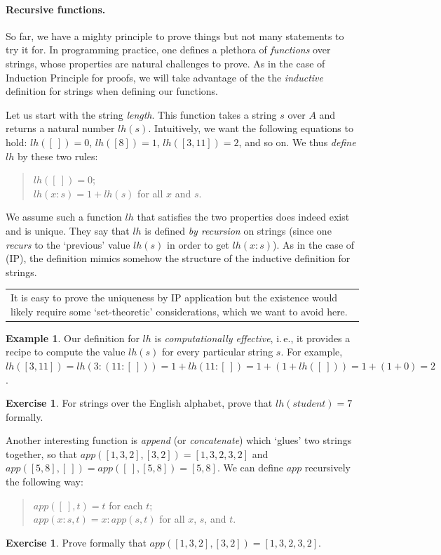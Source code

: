 \documentclass[12pt,notitlepage]{article}
\theoremstyle{plain}
\theoremstyle{definition}
\newtheorem{exc}[thm]{Exercise}
\newtheorem{exm}[thm]{Example}
\theoremstyle{plain}
\newcommand{\1}{\mathbf{1}}
\newcommand{\0}{\mathbf{0}}
\newcommand{\mcomm}[1]{
\medskip\noindent\begin{tabular}{| l}
\parbox{0.99\textwidth}{{\small
#1 }}\end{tabular}
\smallskip}
\begin{document}
\paragraph{Recursive functions.} So far, we have a mighty principle to prove things but not many statements to try it for. In programming practice, one defines a plethora of \emph{functions} over strings, whose properties are natural challenges to prove. As in the case of Induction Principle for proofs, we will take advantage of the the \emph{inductive} definition for strings when defining our functions.

Let us start with the string \emph{length}. This function takes a string $s$ over $A$ and returns a natural number $lh(s)$. Intuitively, we want the following equations to hold: $lh([\ ]) = 0$, $lh([8]) = 1$, $lh([3,11]) = 2$, and so on. We thus \emph{define} $lh$ by these two rules:
\begin{quote}
$lh([\ ]) = 0$;\\
$lh(x : s) = 1 + lh(s)$ for all $x$ and $s$.
\end{quote}
We assume such a function $lh$ that satisfies the two properties does indeed exist and is unique. They say that $lh$ is defined \emph{by recursion} on strings (since one \emph{recurs} to the `previous' value $lh(s)$ in order to get $lh(x: s)$). As in the case of (IP), the definition mimics somehow the structure of the inductive definition for strings.

\mcomm{It is easy to prove the uniqueness by IP application but the existence would likely require some `set-theoretic' considerations, which we want to avoid here.}

\begin{exm}
Our definition for $lh$ is \emph{computationally effective}, i.\,e., it provides a recipe to compute the value $lh(s)$ for every particular string $s$. For example, $lh([3,11]) = lh (3:(11:[\ ])) = 1 + lh (11:[\ ]) = 1 + (1 + lh([\ ])) = 1 + (1 + 0) = 2$.
\end{exm}

\begin{exc}
For strings over the English alphabet, prove that $lh(student) = 7$ formally.
\end{exc}

Another interesting function is \emph{append} (or \emph{concatenate}) which `glues' two strings together, so that $app([1,3,2],[3,2]) = [1,3,2,3,2]$ and $app([5,8], [\ ]) = app([\ ], [5,8]) = [5, 8]$. We can define $app$ recursively the following way:
\begin{quote}
$app([\ ], t) = t$ for each $t$;\\
$app(x : s, t) = x : app(s, t)$ for all $x$, $s$, and $t$.
\end{quote}
\begin{exc}
Prove formally that $app([1,3,2],[3,2]) = [1,3,2,3,2]$.
\end{exc}
\end{document}
